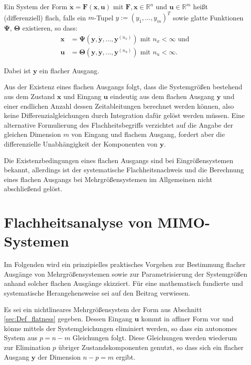 Ein System der Form $\dot{\mathbf{x}} = \mathbf{F}(\mathbf{x}, \mathbf{u})$ mit $\mathbf{F}, \mathbf{x} \in \mathbb{R}^n$ und $\mathbf{u} \in \mathbb{R}^m$ heißt (differenziell) flach, falls ein $m$-Tupel $y := (y_1, ..., y_m)^T$ sowie glatte Funktionen $\mathbf{\Psi}$, $\mathbf{\Theta}$ existieren, so dass:
\begin{align}
\mathbf{x} &= \mathbf{\Psi}(\mathbf{y}, \dot{\mathbf{y}}, ..., \mathbf{y}^{(n_x)}) \text{ mit } n_x < \infty \text{ und } \\
\mathbf{u} &= \mathbf{\Theta}(\mathbf{y}, \dot{\mathbf{y}}, ..., \mathbf{y}^{(n_u)}) \text{ mit } n_u < \infty.
\end{align}

Dabei ist $\mathbf{y}$ ein flacher Ausgang. 

Aus der Existenz eines flachen Ausgangs folgt, dass die Systemgrößen bestehend aus dem Zustand $\mathbf{x}$ und Eingang $\mathbf{u}$ eindeutig aus dem flachen Ausgang $\mathbf{y}$ und einer endlichen Anzahl dessen Zeitableitungen berechnet werden können, also keine Differenzialgleichungen durch Integration dafür gelöst werden müssen. Eine alternative Formulierung des Flachheitsbegriffs verzichtet auf die Angabe der gleichen Dimension $m$ von Eingang und flachem Ausgang, fordert aber die differenzielle Unabhängigkeit der Komponenten von $\mathbf{y}$.

Die Existenzbedingungen eines ﬂachen Ausgangs sind bei Eingrößensystemen bekannt, allerdings ist der systematische Flachheitsnachweis und die Berechnung eines
ﬂachen Ausgangs bei Mehrgrößensystemen im Allgemeinen nicht abschließend gelöst. \cite[S. 185]{NLRT_Roebenack}

\section{Flachheitsanalyse von MIMO-Systemen}

Im Folgenden wird ein prinzipielles praktisches Vorgehen zur Bestimmung flacher Ausgänge von Mehrgrößensystemen sowie zur Parametrisierung der Systemgrößen anhand solcher flachen Ausgänge skizziert. Für eine mathematisch fundierte und systematische Herangehensweise sei auf den Beitrag \cite{Fritzsche2016} verwiesen.

Es sei ein nichtlineares Mehrgrößensystem der Form aus Abschnitt \ref{sec:Def_flatness} gegeben. Dessen Eingang $\mathbf{u}$ kommt in affiner Form vor und könne mittels der Systemgleichungen eliminiert werden, so dass ein autonomes System aus $p = n - m$ Gleichungen folgt. Diese Gleichungen werden wiederum zur Elimination $p$ übriger Zustandskomponenten genutzt, so dass sich ein flacher Ausgang $\mathbf{y}$ der Dimension $n - p = m$ ergibt. 

